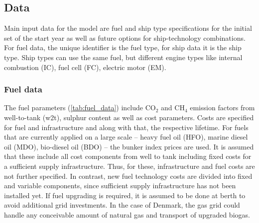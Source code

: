 \documentclass[article]{elsarticle}
\begin{document}
\subsection{Data}
\label{subsec:Dat}
Main input data for the model are fuel and ship type specifications for the initial set of the start year as well as future options for ship-technology combinations. For fuel data, the unique identifier is the fuel type, for ship data it is the ship type. Ship types can use the same fuel, but different engine types like internal combustion (IC), fuel cell (FC), electric motor (EM).

\subsubsection{Fuel data}
The fuel parameters (\autoref{tab:fuel_data}) include CO$_2$ and CH$_4$ emission factors from well-to-tank (w2t), sulphur content as well as cost parameters. Costs are specified for fuel and infrastructure and along with that, the respective lifetime. For fuels that are currently applied on a large scale -- heavy fuel oil (HFO), marine diesel oil (MDO), bio-diesel oil (BDO) -- the bunker index prices are used. It is assumed that these include all cost components from well to tank including fixed costs for a sufficient supply infrastructure. Thus, for these, infrastructure and fuel costs are not further specified. In contrast, new fuel technology costs are divided into fixed and variable components, since sufficient supply infrastructure has not been installed yet. If fuel upgrading is required, it is assumed to be done at berth to avoid additional grid investments. In the case of Denmark, the gas grid could handle any conceivable amount of natural gas and transport of upgraded biogas.
\end{document}

